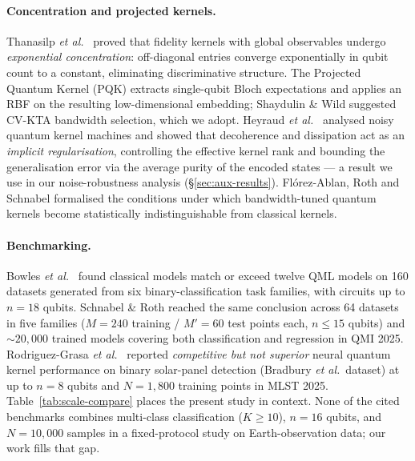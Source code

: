 \documentclass[pdflatex,sn-mathphys]{sn-jnl}
\theoremstyle{plain}
\theoremstyle{remark}
\theoremstyle{definition}
\begin{document}
\paragraph{Concentration and projected kernels.}
Thanasilp \emph{et al.}\ \cite{thanasilp2024} proved that fidelity kernels with global observables undergo \emph{exponential concentration}: off-diagonal entries converge exponentially in qubit count to a constant, eliminating discriminative structure. The Projected Quantum Kernel (PQK) \cite{huang2021} extracts single-qubit Bloch expectations and applies an RBF on the resulting low-dimensional embedding; Shaydulin \& Wild \cite{shaydulin2022} suggested CV-KTA bandwidth selection, which we adopt. Heyraud \emph{et al.}\ \cite{heyraud2022} analysed noisy quantum kernel machines and showed that decoherence and dissipation act as an \emph{implicit regularisation}, controlling the effective kernel rank and bounding the generalisation error via the average purity of the encoded states --- a result we use in our noise-robustness analysis (\S\ref{sec:aux-results}). Fl{\'o}rez-Ablan, Roth and Schnabel \cite{florezablan2025} formalised the conditions under which bandwidth-tuned quantum kernels become statistically indistinguishable from classical kernels.

\paragraph{Benchmarking.}
Bowles \emph{et al.}\ \cite{bowles2024} found classical models match or exceed twelve QML models on 160 datasets generated from six binary-classification task families, with circuits up to $n\!=\!18$ qubits. Schnabel \& Roth \cite{schnabel2025} reached the same conclusion across 64 datasets in five families ($M\!=\!240$ training / $M'\!=\!60$ test points each, $n\!\le\!15$ qubits) and $\sim\!20{,}000$ trained models covering both classification and regression in QMI 2025. Rodriguez-Grasa \emph{et al.}\ \cite{rodriguez2025} reported \emph{competitive but not superior} neural quantum kernel performance on binary solar-panel detection (Bradbury \emph{et al.}\ dataset) at up to $n\!=\!8$ qubits and $N\!=\!1{,}800$ training points in MLST 2025.
Table~\ref{tab:scale-compare} places the present study in context. None of the cited benchmarks combines multi-class classification ($K\ge 10$), $n=16$ qubits, and $N=10{,}000$ samples in a fixed-protocol study on Earth-observation data; our work fills that gap.
\end{document}
